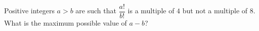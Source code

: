 Positive integers $a>b$ are such that $\dfrac{a!}{b!}$ is a multiple of $4$ but not a multiple of $8$. What is the maximum possible value of $a-b$?
